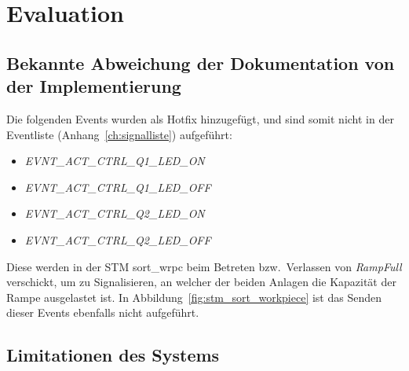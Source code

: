 \chapter{Evaluation}\label{ch:evaluation}



\section{Bekannte Abweichung der Dokumentation von der Implementierung}
\label{sec:bekannte-abweichung-der-dokumentation-von-der-implementierung}

Die folgenden Events wurden als Hotfix hinzugefügt, und sind somit nicht in der Eventliste
(Anhang~\ref{ch:signalliste})
aufgeführt:
\begin{itemize}
    \item \textit{EVNT\_ACT\_CTRL\_Q1\_LED\_ON}
    \item \textit{EVNT\_ACT\_CTRL\_Q1\_LED\_OFF}
    \item \textit{EVNT\_ACT\_CTRL\_Q2\_LED\_ON}
    \item \textit{EVNT\_ACT\_CTRL\_Q2\_LED\_OFF}
\end{itemize}
Diese werden in der STM sort\_wrpc beim Betreten bzw.\ Verlassen von \textit{RampFull} verschickt,
um zu Signalisieren, an welcher der beiden Anlagen die Kapazität der Rampe ausgelastet ist.
In Abbildung~\ref{fig:stm_sort_workpiece} ist das Senden dieser Events ebenfalls nicht
aufgeführt.


\section{Limitationen des Systems}\label{sec:limitations}

